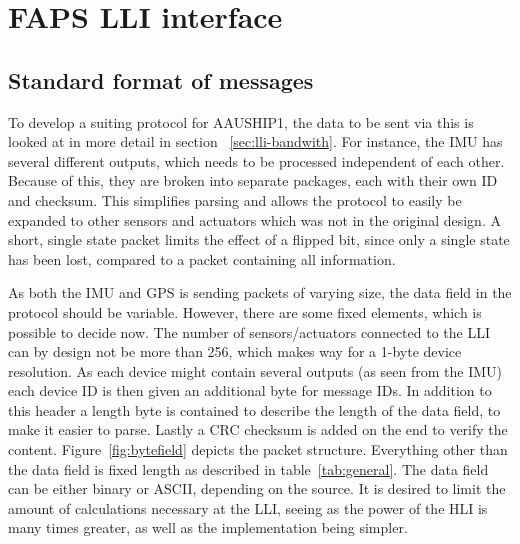\chapter{FAPS LLI interface}
\section{Standard format of messages}

To develop a suiting protocol for AAUSHIP1, the data to be sent via this is looked at in more detail in section ~\vref{sec:lli-bandwith}. For instance, the \ac{IMU} has several different outputs, which needs to be processed independent of each other. Because of this, they are broken into separate packages, each with their own ID and checksum. This simplifies parsing and allows the protocol to easily be expanded to other sensors and actuators which was not in the original design. A short, single state packet limits the effect of a flipped bit, since only a single state has been lost, compared to a packet containing all information.

As both the \ac{IMU} and \ac{GPS} is sending packets of varying size, the data field in the protocol should be variable. However, there are some fixed elements, which is possible to decide now. The number of sensors/actuators connected to the \ac{LLI} can by design not be more than 256, which makes way for a 1-byte device resolution. As each device might contain several outputs (as seen from the \ac{IMU}) each device ID is then given an additional byte for message IDs. In addition to this header a length byte is contained to describe the length of the data field, to make it easier to parse. Lastly a \ac{CRC} checksum is added on the end to verify the content. Figure~\vref{fig:bytefield} depicts the packet structure. Everything other than the data field is fixed length as described in table~\vref{tab:general}. 
The data field can be either binary or ASCII, depending on the source. It is desired to limit the amount of calculations necessary at the LLI, seeing as the power of the HLI is many times greater, as well as the implementation being simpler.


